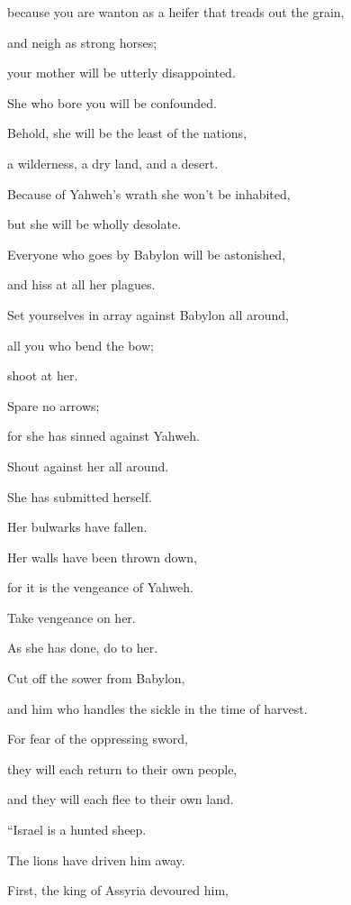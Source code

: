 {\par }{\QB because you are wanton as a heifer that treads out the grain,
\par }{\QB and neigh as strong horses;
\par }{\Q {}your mother will be utterly disappointed.
\par }{\QB She who bore you will be confounded.
\par }{\Q Behold, she will be the least of the nations,
\par }{\QB a wilderness, a dry land, and a desert.
\par }{\Q {}Because of Yahweh’s wrath she won’t be inhabited,
\par }{\QB but she will be wholly desolate.
\par }{\Q Everyone who goes by Babylon will be astonished,
\par }{\QB and hiss at all her plagues.
\par }{\Q {}Set yourselves in array against Babylon all around,
\par }{\QB all you who bend the bow;
\par }{\QB shoot at her.
\par }{\Q Spare no arrows;
\par }{\QB for she has sinned against Yahweh.
\par }{\Q {}Shout against her all around.
\par }{\QB She has submitted herself.
\par }{\QB Her bulwarks have fallen.
\par }{\Q Her walls have been thrown down,
\par }{\QB for it is the vengeance of Yahweh.
\par }{\Q Take vengeance on her.
\par }{\QB As she has done, do to her.
\par }{\Q {}Cut off the sower from Babylon,
\par }{\QB and him who handles the sickle in the time of harvest.
\par }{\Q For fear of the oppressing sword,
\par }{\QB they will each return to their own people,
\par }{\QB and they will each flee to their own land.
\par }{\BB \par }{\Q {}“Israel is a hunted sheep.
\par }{\QB The lions have driven him away.
\par }{\Q First, the king of Assyria devoured him,
}
